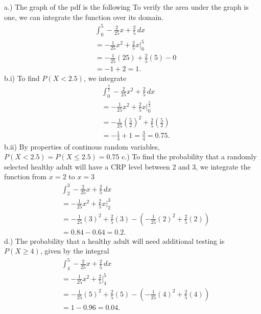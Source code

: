 \documentclass{report}
\begin{document}
 \pagebreak \bigbreak \noindent 
 a.) The graph of the pdf is the following
 \bigbreak \noindent 
 \bigbreak \noindent 
 To verify the area under the graph is one, we can integrate the function over its domain.
 \begin{align*}
     &\int_{0}^{5} -\frac{2}{25}x+\frac{2}{5} \, dx \\
     &=-\frac{1}{25}x^{2}+\frac{2}{5}x \bigg|^{5}_{0} \\
     &= -\frac{1}{25}(25)+\frac{2}{5}(5) - 0 \\
     &= -1 + 2 = 1
 .\end{align*}
 \bigbreak \noindent 
 b.i) To find $P(X < 2.5)$, we integrate 
 \begin{align*}
     &\int_{0}^{\frac{5}{2}}-\frac{2}{25}x^{2} + \frac{2}{5}  \, dx \\
     &=-\frac{1}{25}x^{2} + \frac{2}{5}x \bigg|^{\frac{5}{2}}_{0} \\
     &= -\frac{1}{25}\left(\frac{5}{2}\right)^{2} + \frac{2}{5}\left(\frac{5}{2}\right) \\
     &=-\frac{1}{4} + 1 = \frac{3}{4} = 0.75
 .\end{align*}
 b.ii) By properties of continous random variables, $P(X < 2.5) = P(X \leq 2.5) = 0.75$ 
 \bigbreak \noindent 
 c.) To find the probability that a randomly selected healthy adult will have a CRP level between 2 and 3, we integrate the function from $x=2$ to $x=3$
 \begin{align*}
     &\int_{2}^{3} -\frac{2}{25}x + \frac{2}{5} \, dx \\
     &=-\frac{1}{25}x^{2} + \frac{2}{5}x \bigg|^{3}_{2} \\
     &=-\frac{1}{25}(3)^{2} + \frac{2}{5}(3) - (-\frac{1}{25}(2)^{2}+ \frac{2}{5}(2)) \\
     &=0.84 - 0.64 = 0.2
 .\end{align*}
 \bigbreak \noindent 
 d.) The probability that a healthy adult will need additional testing is $P(X \geq 4)$, given by the integral
 \begin{align*}
     &\int_{4}^{5} -\frac{2}{25}x + \frac{2}{5} \, dx \\
     &=-\frac{1}{25}x^{2} + \frac{2}{5} \bigg|^{5}_{4} \\
     &=-\frac{1}{25}(5)^{2} + \frac{2}{5}(5) - (-\frac{1}{25}(4)^{2} + \frac{2}{5}(4)) \\
     &=1-0.96 = 0.04
 .\end{align*}
\end{document}
